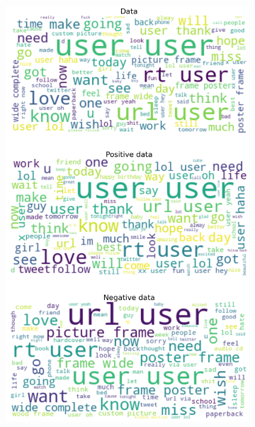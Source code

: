 \documentclass{article}
\begin{document}
\begin{itemize}
\begin{figure}[H]
\centering
\captionsetup{justification=centering}
\begin{subfigure}[b]{0.24\textwidth}
\centering
\includegraphics[width=\textwidth]{chapter-06/section-01-01/04/visualization/1/wordcloud.png}
\end{subfigure}
\begin{subfigure}[b]{0.24\textwidth}
\centering

\end{subfigure}
\end{figure}
\end{itemize}
\end{document}

